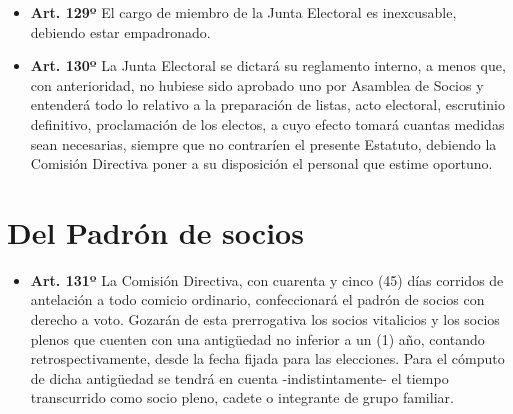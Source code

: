 \documentclass[]{book}
\providecommand{\tightlist}{%
  \setlength{\itemsep}{0pt}\setlength{\parskip}{0pt}}
\begin{document}
\begin{itemize}
\tightlist
\item
  \textbf{Art. 129º}
  El cargo de miembro de la Junta Electoral es inexcusable, debiendo estar empadronado.
\end{itemize}

\begin{itemize}
\tightlist
\item
  \textbf{Art. 130º}
  La Junta Electoral se dictará su reglamento interno, a menos que, con anterioridad, no hubiese sido aprobado uno por Asamblea de Socios y entenderá todo lo relativo a la preparación de listas, acto electoral, escrutinio definitivo, proclamación de los electos, a cuyo efecto tomará cuantas medidas sean necesarias, siempre que no contraríen el presente Estatuto, debiendo la Comisión Directiva poner a su disposición el personal que estime oportuno.
\end{itemize}

\hypertarget{del-padron-de-socios}{%
\section{Del Padrón de socios}\label{del-padron-de-socios}}

\begin{itemize}
\tightlist
\item
  \textbf{Art. 131º}
  La Comisión Directiva, con cuarenta y cinco (45) días corridos de antelación a todo comicio ordinario, confeccionará el padrón de socios con derecho a voto. Gozarán de esta prerrogativa los socios vitalicios y los socios plenos que cuenten con una antigüedad no inferior a un (1) año, contando retrospectivamente, desde la fecha fijada para las elecciones. Para el cómputo de dicha antigüedad se tendrá en cuenta -indistintamente- el tiempo transcurrido como socio pleno, cadete o integrante de grupo familiar.
\end{itemize}
\end{document}
